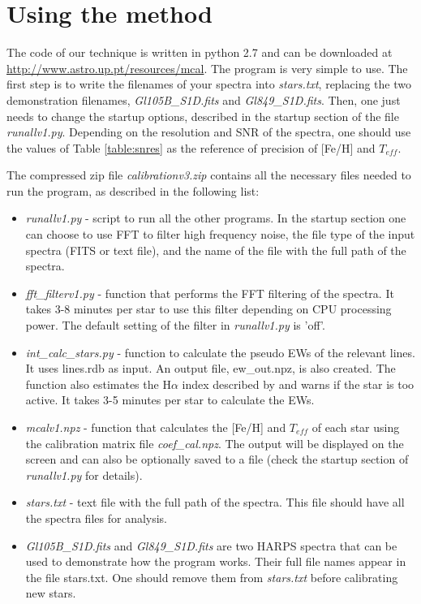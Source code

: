 \documentclass[referee]{aa}
\begin{document}
\appendix

\section{Using the method}

The code of our technique is written in python 2.7 and can be downloaded at \url{http://www.astro.up.pt/resources/mcal}. The program is very simple to use. The first step is to write the filenames of your spectra into \textit{stars.txt}, replacing the two demonstration filenames, \textit{Gl105B\_S1D.fits} and \textit{Gl849\_S1D.fits}. Then, one just needs to change the startup options, described in the startup section of the file \textit{runallv1.py}. Depending on the resolution and SNR of the spectra, one should use the values of Table \ref{table:snres} as the reference of precision of [Fe/H] and $T_{eff}$.

The compressed zip file \textit{calibrationv3.zip} contains all the necessary files needed to run the program, as described in the following list:
\begin{itemize}
\item \textit{runallv1.py} - script to run all the other programs. In the startup section one can choose to use FFT to filter high frequency noise, the file type of the input spectra (FITS or text file), and the name of the file with the full path of the spectra.
\item \textit{fft\_filterv1.py} - function that performs the FFT filtering of the spectra.  It takes 3-8 minutes per star to use this filter depending on CPU processing power. The default setting of the filter in \textit{runallv1.py} is 'off'.
\item \textit{int\_calc\_stars.py} - function to calculate the pseudo EWs of the relevant lines. It uses lines.rdb as input. An output file, ew\_out.npz, is also created. The function also estimates the H$\alpha$ index described by \citet{Gomes_da_Silva-2011} and warns if the star is too active. It takes 3-5 minutes per star to calculate the EWs.
\item \textit{mcalv1.npz} - function that calculates the [Fe/H] and $T_{eff}$ of each star using the calibration matrix file \textit{coef\_cal.npz}. The output will be displayed on the screen and can also be optionally saved to a file (check the startup section of \textit{runallv1.py} for details). 
\item \textit{stars.txt} - text file with the full path of the spectra. This file should have all the spectra files for analysis.
\item \textit{Gl105B\_S1D.fits} and \textit{Gl849\_S1D.fits} are two HARPS spectra that can be used to demonstrate how the program works. Their full file names appear in the file stars.txt. One should remove them from \textit{stars.txt} before calibrating new stars.
\end{itemize}







\end{document}
